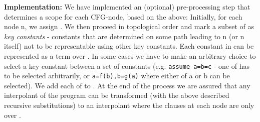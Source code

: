 \textbf{Implementation:}
We have implemented an (optional) pre-processing step that determines a scope for each CFG-node, based on the above:
Initially, for each node n, we assign . 
We then proceed in topological order and mark a subset  of  as \emph{key constants} - constants that are determined on some path leading to n (or n itself) not to be representable using other key constants. Each constant in  can be represented as a term over .
In some cases we have to make an arbitrary choice to select a key constant between a set of constants (e.g. \lstinline|assume a=b=c| - one of  has to be selected arbitrarily, or \lstinline|a=f(b),b=g(a)| where either of a or b can be selected).
We add each of  to .
At the end of the process we are assured that any interpolant of the program can be transformed (with the above described recursive substitutions) to an interpolant where the clauses at each node are only over .





